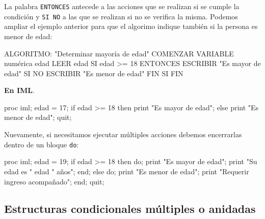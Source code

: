 \documentclass[
]{book}
\newenvironment{Shaded}{\begin{snugshade}}{\end{snugshade}}
\newcommand{\NormalTok}[1]{#1}
\begin{document}
La palabra \texttt{ENTONCES} antecede a las acciones que se realizan si se cumple la condición y \texttt{SI\ NO} a las que se realizan si no se verifica la misma. Podemos ampliar el ejemplo anterior para que el algorimo indique también si la persona es menor de edad:

\begin{Shaded}
\begin{Highlighting}[]
\NormalTok{ALGORITMO: "Determinar mayoría de edad"}
\NormalTok{COMENZAR}
\NormalTok{    VARIABLE numérica edad}
\NormalTok{    LEER edad}
\NormalTok{    SI edad \textgreater{}= 18 }
\NormalTok{        ENTONCES}
\NormalTok{            ESCRIBIR "Es mayor de edad"}
\NormalTok{        SI NO}
\NormalTok{            ESCRIBIR "Es menor de edad"}
\NormalTok{    FIN SI}
\NormalTok{FIN}
\end{Highlighting}
\end{Shaded}

\textbf{En IML}.

\begin{Shaded}
\begin{Highlighting}[]
\NormalTok{proc iml;}
\NormalTok{    edad = 17;}
\NormalTok{    if edad \textgreater{}= 18 then print "Es mayor de edad";}
\NormalTok{    else print "Es menor de edad";}
\NormalTok{quit;}
\end{Highlighting}
\end{Shaded}

Nuevamente, si necesitamos ejecutar múltiples acciones debemos encerrarlas dentro de un bloque \texttt{do}:

\begin{Shaded}
\begin{Highlighting}[]
\NormalTok{proc iml;}
\NormalTok{    edad = 19;}
\NormalTok{    if edad \textgreater{}= 18 then do;}
\NormalTok{        print "Es mayor de edad";}
\NormalTok{        print "Su edad es " edad " años";}
\NormalTok{    end;}
\NormalTok{    else do;}
\NormalTok{        print "Es menor de edad";}
\NormalTok{        print "Requerir ingreso acompañado";}
\NormalTok{    end;}
\NormalTok{quit;}
\end{Highlighting}
\end{Shaded}

\hypertarget{estructuras-condicionales-muxfaltiples-o-anidadas}{%
\subsection{Estructuras condicionales múltiples o anidadas}\label{estructuras-condicionales-muxfaltiples-o-anidadas}}
\end{document}
